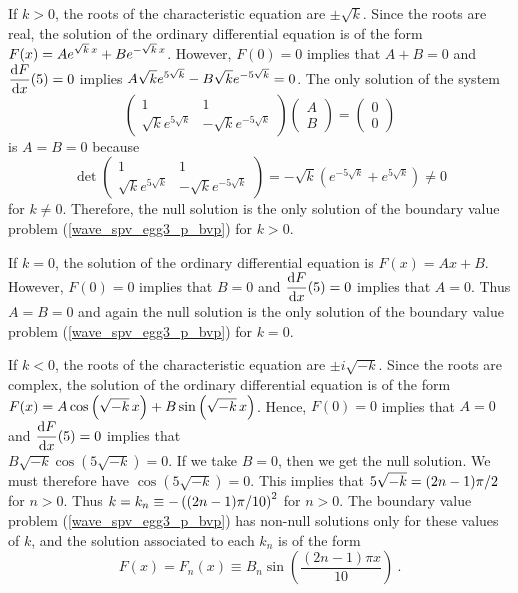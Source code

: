 \begin{egg}
If $k>0$, the roots of the characteristic equation are $\pm \sqrt{k}$.
Since the roots are real, the solution of the ordinary differential
equation is of the form
$\displaystyle F(x) = A e^{\sqrt{k}\,x} + B e^{-\sqrt{k}\, x}$.
However, $F(0)=0$ implies that $A+B=0$ and
$\displaystyle \frac{\mathrm{d}F}{\mathrm{d}{x}}(5)=0$ implies
$\displaystyle A\sqrt{k} e^{5\sqrt{k}} - B\sqrt{k} e^{-5\sqrt{k}} = 0$.
The only solution of the system
\[
\begin{pmatrix}
1 & 1 \\ \sqrt{k} e^{5\sqrt{k}} & -\sqrt{k} e^{-5\sqrt{k}}
\end{pmatrix}
\begin{pmatrix}
A \\ B
\end{pmatrix}
=
\begin{pmatrix}
0 \\ 0 
\end{pmatrix}
\]
is $A=B=0$ because
\[
\det
\begin{pmatrix}
1 & 1 \\ \sqrt{k} e^{5\sqrt{k}} & -\sqrt{k} e^{-5\sqrt{k}}
\end{pmatrix}
= -\sqrt{k} \left(e^{-5\sqrt{k}} + e^{5\sqrt{k}}\right) 
\neq 0
\]
for $k\neq 0$.  Therefore, the null solution is the only solution
of the boundary value problem (\ref{wave_spv_egg3_p_bvp}) for $k>0$.

If $k=0$, the solution of the ordinary differential equation is $F(x)=Ax+B$.
However, $F(0)=0$ implies that $B=0$ and
$\displaystyle \frac{\mathrm{d}F}{\mathrm{d}{x}}(5)=0$ implies that $A = 0$.
Thus $A=B=0$ and again the null solution is the
only solution of the boundary value problem (\ref{wave_spv_egg3_p_bvp})
for $k=0$.

If $k<0$, the roots of the characteristic equation are $\pm i \sqrt{-k}$.
Since the roots are complex, the solution of the ordinary differential
equation is of the form $\displaystyle
F(x) = A \cos\left(\sqrt{-k}\,x\right) + B \sin\left(\sqrt{-k}\,x\right)$.
Hence, $F(0)=0$ implies that $A=0$ and
$\displaystyle \frac{\mathrm{d}F}{\mathrm{d}{x}}(5)=0$ implies that\\
$B \sqrt{-k} \cos(5\sqrt{-k}) = 0$.  If we take
$B=0$, then we get the null solution.  We must therefore have
$\cos(5\sqrt{-k}) = 0$.  This implies that
$\displaystyle 5\sqrt{-k} = (2n-1)\pi/2$ for $n >0$. Thus
$\displaystyle k = k_n \equiv -\left((2n-1)\pi/10\right)^2$
for $n>0$.
The boundary value problem (\ref{wave_spv_egg3_p_bvp}) has non-null
solutions only for these values of $k$, and the solution associated
to each $k_n$ is of the form
\[
F(x)=F_n(x) \equiv B_n \sin\left(\frac{(2n-1)\pi x}{10}\right) \  .
\]


\end{egg}
